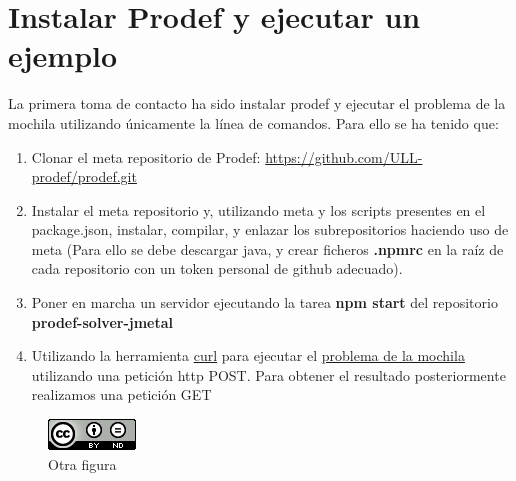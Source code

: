 \section{Instalar Prodef y ejecutar un ejemplo}
La primera toma de contacto ha sido instalar prodef y ejecutar el problema de la mochila utilizando únicamente la línea de comandos. Para ello se ha tenido que:
\begin{enumerate}
  \item Clonar el meta repositorio de Prodef: \url{https://github.com/ULL-prodef/prodef.git}
  \item Instalar el meta repositorio y, utilizando meta y los scripts presentes en el package.json, instalar, compilar, y enlazar los subrepositorios haciendo uso de meta (Para ello se debe descargar java, y crear ficheros \textbf{.npmrc} en la raíz de cada repositorio con un token personal de github adecuado).
  \item Poner en marcha un servidor ejecutando la tarea \textbf{npm start} del repositorio \textbf{prodef-solver-jmetal}
  \item Utilizando la herramienta \href{https://curl.se/}{curl} para ejecutar el \href{https://github.com/PAL-ULL/tfg-andres-calimero-prodef-common/blob/master/src/examples/problems/knapsack.json}{problema de la mochila} utilizando una petición http POST. Para obtener el resultado posteriormente realizamos una petición GET
  
\end{enumerate}
\begin{figure}[htb]
   \centering
   \includegraphics[width=0.5\linewidth]{images/by-nd_88x31}
   \caption{Otra figura}
   \label{fig:intro}
\end{figure}

